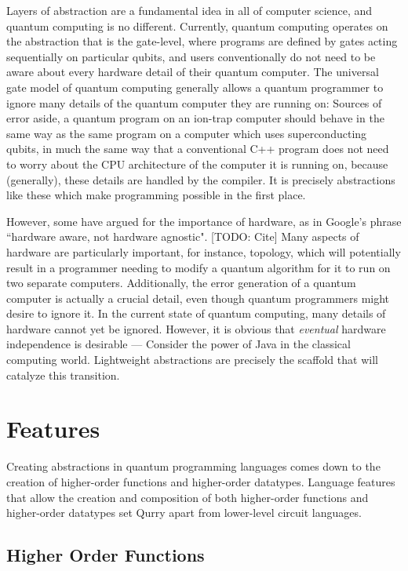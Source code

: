 \documentclass[journal]{article}
\begin{document}
Layers of abstraction are a fundamental idea in all of computer science, and quantum computing is no different.
Currently, quantum computing operates on the abstraction that is the gate-level, where programs are defined by gates acting sequentially on particular qubits, and users conventionally do not need to be aware about every hardware detail of their quantum computer.
The universal gate model of quantum computing generally allows a quantum programmer to ignore many details of the quantum computer they are running on: Sources of error aside, a quantum program on an ion-trap computer should behave in the same way as the same program on a computer which uses superconducting qubits, in much the same way that a conventional C++ program does not need to worry about the CPU architecture of the computer it is running on, because (generally), these details are
handled by the compiler.
It is precisely abstractions like these which make programming possible in the first place.

However, some have argued for the importance of hardware, as in Google's phrase ``hardware aware, not hardware agnostic". [TODO: Cite]
Many aspects of hardware are particularly important, for instance, topology, which will potentially result in a programmer needing to modify a quantum algorithm for it to run on two separate computers.
Additionally, the error generation of a quantum computer is actually a crucial detail, even though quantum programmers might desire to ignore it.
In the current state of quantum computing, many details of hardware cannot yet be ignored. 
However, it is obvious that \emph{eventual} hardware independence is desirable --- Consider the power of Java in the classical computing world. Lightweight abstractions are precisely the scaffold that will catalyze this transition.

\section{Features}

    Creating abstractions in quantum programming languages comes down to the creation of higher-order functions and higher-order datatypes.
    Language features that allow the creation and composition of both higher-order functions and higher-order datatypes set Qurry apart from lower-level circuit languages.

    \subsection{Higher Order Functions}
\end{document}
